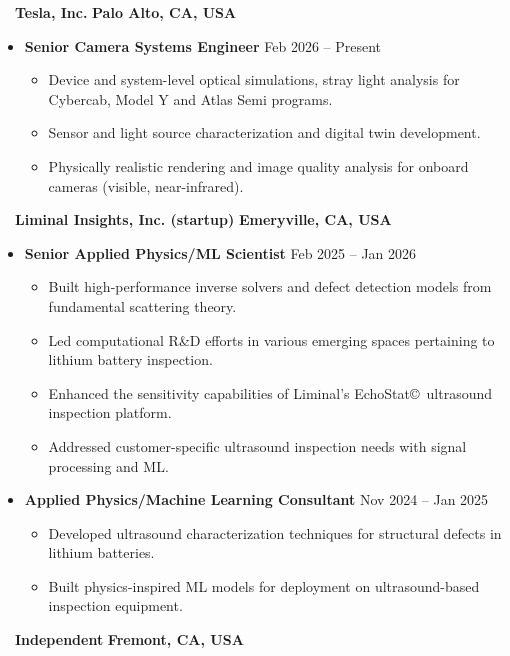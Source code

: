 \documentclass[10.5pt]{article}
\begin{document}
~~{\color{black}\textbf{Tesla, Inc.} \hfill  \textbf{Palo Alto, CA, USA}}\par
\begin{itemize}
    \item
    \textbf{Senior Camera Systems Engineer}
    \hfill  {Feb 2026 -- Present} \par
    \begin{itemize}
        \item Device and system-level optical simulations, stray light analysis for Cybercab, Model Y and Atlas Semi programs.
        \item Sensor and light source characterization and digital twin development. 
        \item Physically realistic rendering and image quality analysis for onboard cameras (visible, near-infrared).
    \end{itemize}
\end{itemize} ~~{\color{black}\textbf{Liminal Insights, Inc. (startup)} \hfill  \textbf{Emeryville, CA, USA}}\par
\begin{itemize}
    \item
    \textbf{Senior Applied Physics/ML Scientist}
    \hfill  {Feb 2025 -- Jan 2026} \par
        \begin{itemize}
            \item Built high-performance inverse solvers and defect detection models from fundamental scattering theory.  
            \item Led computational R\&D efforts in various emerging spaces pertaining to lithium battery inspection.               
            \item Enhanced the sensitivity capabilities of Liminal's EchoStat\copyright~ultrasound inspection platform. 
            \item Addressed customer-specific ultrasound inspection needs with signal processing and ML. 
        \end{itemize}
    \item
        \textbf{Applied Physics/Machine Learning Consultant}
        \hfill  {Nov 2024 -- Jan 2025} \par
        \begin{itemize}
            \item Developed ultrasound characterization techniques for structural defects in lithium batteries. 
            \item Built physics-inspired ML models for deployment on ultrasound-based inspection equipment.
        \end{itemize}
\end{itemize} ~~{\color{black}\textbf{Independent} \hfill  \textbf{Fremont, CA, USA}}\par
\end{document}
